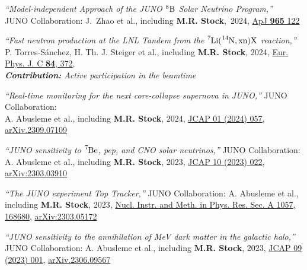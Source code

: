 \documentclass[letterpaper,12pt, oneside]{article}
\begin{document}
\begin{etaremune}[leftmargin=1.65em]
\item \textit{“Model-independent Approach of the JUNO $\ce{{^8}B}$ Solar Neutrino Program,”} \\ JUNO Collaboration: J.~Zhao et al., including \textbf{M.R. Stock},~2024, \href{https://doi.org/10.3847/1538-4357/ad2bfd}{ApJ \textbf{965} 122}

\item \textit{“Fast neutron production at the LNL Tandem from the $\ce{^{7}Li}(\ce{^{14}N},\ce{xn})\ce{X}$ reaction,”} \\  P. Torres-Sánchez, H. Th. J. Steiger et al., including \textbf{M.R. Stock}, 2024, \href{https://doi.org/10.1140/epjc/s10052-024-12658-0}{Eur. Phys. J. C \textbf{84}, 372},\\
\textit{\textbf{Contribution:} Active participation in the beamtime}

\item \textit{“Real-time monitoring for the next core-collapse supernova in JUNO,”} JUNO Collaboration: \\ A. Abusleme et al., including \textbf{M.R. Stock}, 2024,
\href{https://doi.org/10.1088/1475-7516/2024/01/057}{JCAP 01 (2024) 057}, \href{https://doi.org/10.48550/arXiv.2309.07109}{arXiv.2309.07109}

\item \textit{“JUNO sensitivity to $\ce{^{7}Be}$, pep, and CNO solar neutrinos,”} JUNO Collaboration: \\ A. Abusleme et al., including \textbf{M.R. Stock}, 2023, \href{https://doi.org/10.1088/1475-7516/2023/10/022}{JCAP 10 (2023) 022}, \href{https://doi.org/10.48550/arXiv.2303.03910}{arXiv:2303.03910}

\item \textit{“The JUNO experiment Top Tracker,”} JUNO Collaboration: A. Abusleme et al., \\  including \textbf{M.R. Stock}, 2023, \href{https://doi.org/10.1016/j.nima.2023.168680}{Nucl. Instr. and Meth. in Phys. Res. Sec. A 1057, 168680},  \href{https://doi.org/10.48550/arXiv.2303.05172}{arXiv:2303.05172}

\item \textit{“JUNO sensitivity to the annihilation of MeV dark matter in the galactic halo,”} \\ JUNO Collaboration: A. Abusleme et al., including \textbf{M.R. Stock}, 2023, \href{https://doi.org/10.1088/1475-7516/2023/09/001}{JCAP 09 (2023) 001}, \href{https://doi.org/10.48550/arXiv.2306.09567}{arXiv.2306.09567}


\end{etaremune}
\end{document}
